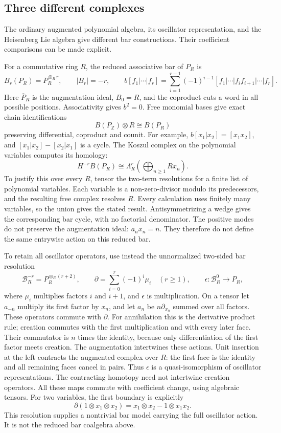 \subsection{Three different complexes}

The ordinary augmented polynomial algebra, its oscillator representation,
and the Heisenberg Lie algebra give different bar constructions.
Their coefficient comparisons can be made explicit.

For a commutative ring $R$, the reduced associative bar of $P_R$ is
\[
 B_r(P_R)=\overline P_R^{\otimes_R r},\qquad |B_r|=-r,
 \qquad
 b[f_1|\cdots|f_r]
 =\sum_{i=1}^{r-1}(-1)^{i-1}
 [f_1|\cdots|f_if_{i+1}|\cdots|f_r].
\]
Here $\overline P_R$ is the augmentation ideal, $B_0=R$, and the
coproduct cuts a word in all possible positions. Associativity gives
$b^2=0$. Free monomial bases give exact chain identifications
\[
 B(P_{\mathbb Z})\otimes R\cong B(P_R)
\]
preserving differential, coproduct and counit. For example,
$b[x_1|x_2]=[x_1x_2]$, and
$[x_1|x_2]-[x_2|x_1]$ is a cycle.
The Koszul complex on the polynomial variables computes its homology:
\[
 H^{-r}B(P_R)\cong\Lambda_R^r\!\left(\bigoplus_{n\ge1}Rx_n\right).
\]
To justify this over every $R$, tensor the two-term resolutions for a
finite list of polynomial variables. Each variable is a non-zero-divisor
modulo its predecessors, and the resulting free complex resolves $R$.
Every calculation uses finitely many variables, so the union gives the
stated result. Antisymmetrizing a wedge gives the corresponding bar cycle,
with no factorial denominator.
The positive modes do not preserve the augmentation ideal:
$a_nx_n=n$. They therefore do not define the same entrywise action
on this reduced bar.

To retain all oscillator operators, use instead the unnormalized
two-sided bar resolution
\[
 \mathcal B^{-r}_R=P_R^{\otimes_R(r+2)},\qquad
 \partial=\sum_{i=0}^r(-1)^i\mu_i\quad(r\ge1),
 \qquad \epsilon:\mathcal B^0_R\to P_R,
\]
where $\mu_i$ multiplies factors $i$ and $i+1$, and $\epsilon$ is
multiplication. On a tensor let $a_{-n}$ multiply its first factor by
$x_n$, and let $a_n$ be $n\partial_{x_n}$ summed over all factors.
These operators commute with $\partial$. For annihilation this is the
derivative product rule; creation commutes with the first multiplication
and with every later face. Their commutator is $n$ times the identity,
because only differentiation of the first factor meets creation.
The augmentation intertwines these actions.
Unit insertion at the left contracts the augmented complex over $R$:
the first face is the identity and all remaining faces cancel in pairs.
Thus $\epsilon$ is a quasi-isomorphism of oscillator representations.
The contracting homotopy need not intertwine creation operators.
All these maps commute with coefficient change, using algebraic tensors.
For two variables, the first boundary is explicitly
\[
 \partial(1\otimes x_1\otimes x_2)
 =x_1\otimes x_2-1\otimes x_1x_2.
\]
This resolution supplies a nontrivial bar model carrying the full
oscillator action. It is not the reduced bar coalgebra above.

